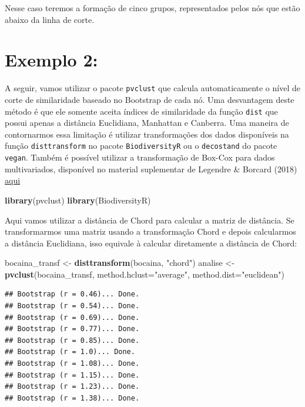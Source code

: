 \documentclass[
]{book}
\newenvironment{Shaded}{\begin{snugshade}}{\end{snugshade}}
\newcommand{\DataTypeTok}[1]{\textcolor[rgb]{0.13,0.29,0.53}{#1}}
\newcommand{\KeywordTok}[1]{\textcolor[rgb]{0.13,0.29,0.53}{\textbf{#1}}}
\newcommand{\NormalTok}[1]{#1}
\newcommand{\StringTok}[1]{\textcolor[rgb]{0.31,0.60,0.02}{#1}}
\begin{document}
Nesse caso teremos a formação de cinco grupos, representados pelos nós que estão abaixo da linha de corte.

\hypertarget{exemplo-2}{%
\section{Exemplo 2:}\label{exemplo-2}}

A seguir, vamos utilizar o pacote \texttt{pvclust} que calcula automaticamente o nível de corte de similaridade baseado no Bootstrap de cada nó. Uma desvantagem deste método é que ele somente aceita índices de similaridade da função \texttt{dist} que possui apenas a distância Euclidiana, Manhattan e Canberra. Uma maneira de contornarmos essa limitação é utilizar transformações dos dados disponíveis na função \texttt{disttransform} no pacote \texttt{BiodiversityR} ou o \texttt{decostand} do pacote \texttt{vegan}. Também é possível utilizar a transformação de Box-Cox para dados multivariados, disponível no material suplementar de Legendre \& Borcard (2018) \href{http://www.ecography.org/appendix/ecog-03498}{aqui}

\begin{Shaded}
\begin{Highlighting}[]
\KeywordTok{library}\NormalTok{(pvclust)}
\KeywordTok{library}\NormalTok{(BiodiversityR)}
\end{Highlighting}
\end{Shaded}

Aqui vamos utilizar a distância de Chord para calcular a matriz de distância. Se transformarmos uma matriz usando a transformação Chord e depois calcularmos a distância Euclidiana, isso equivale à calcular diretamente a distância de Chord:

\begin{Shaded}
\begin{Highlighting}[]
\NormalTok{bocaina_transf <-}\StringTok{ }\KeywordTok{disttransform}\NormalTok{(bocaina, }\StringTok{"chord"}\NormalTok{)}
\NormalTok{analise <-}\StringTok{ }\KeywordTok{pvclust}\NormalTok{(bocaina_transf, }\DataTypeTok{method.hclust=}\StringTok{"average"}\NormalTok{, }\DataTypeTok{method.dist=}\StringTok{"euclidean"}\NormalTok{) }
\end{Highlighting}
\end{Shaded}

\begin{verbatim}
## Bootstrap (r = 0.46)... Done.
## Bootstrap (r = 0.54)... Done.
## Bootstrap (r = 0.69)... Done.
## Bootstrap (r = 0.77)... Done.
## Bootstrap (r = 0.85)... Done.
## Bootstrap (r = 1.0)... Done.
## Bootstrap (r = 1.08)... Done.
## Bootstrap (r = 1.15)... Done.
## Bootstrap (r = 1.23)... Done.
## Bootstrap (r = 1.38)... Done.
\end{verbatim}
\end{document}
